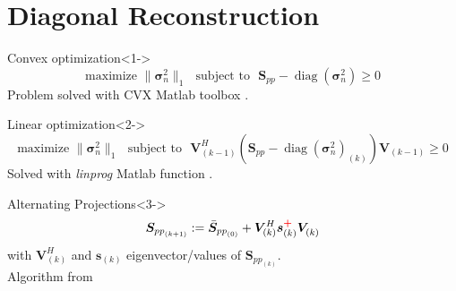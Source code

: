 \documentclass[9pt,xcolor=x11names,compress, notes=show]{beamer}%
\newcommand{\diag}[1]{\operatorname{diag}\left(#1\right)}
\begin{document}
\section{Diagonal Reconstruction}
\begin{frame}{\insertsectionhead}	
	\begin{block}{Convex optimization}<1->
		\begin{equation*}
        			\text{maximize~} \| \bm{\sigma}_{n}^2\|_1 \text{~~subject to~~} \bm{S}_{pp}- \diag{\bm{\sigma}_n^2} \geq 0
		\end{equation*}
		Problem solved with CVX Matlab toolbox \citep{Hald2017}.
	\end{block}
	\begin{block}{Linear optimization}<2->
		\begin{equation*}
			\text{maximize~} \| \bm{\sigma}_{n}^2\|_1   \text{~~subject to~~}  \bm{V}^{H}_{(k-1)} \left( \bm{S}_{pp}- \diag{\bm{\sigma}_n^2}_{(k)} \right) \bm{V}_{(k-1)} \geq 0 
		\end{equation*}
		Solved with \textit{linprog} Matlab function \citep{dougherty2016}.
	\end{block}
	\begin{block}{Alternating Projections}<3->
		\begin{equation*}
        			 \bm{S}_{{pp}_{(k+1)}} := \bar{\bm{S}}_{{pp}_{(0)}} + \bm{V}^{H}_{(k)} \bm{s}_{(k)}^{\textcolor{red}{\textbf{+}}}\bm{V}^{~}_{(k)}
		\end{equation*}
		with $\bm{V}^{H}_{(k)}$ and $\bm{s}_{(k)}$ eigenvector/values of  $\bm{S}_{{pp}_{(k)}}$.\\
		Algorithm from \cite{leclere:hal-01279944}	
	\end{block}	
\end{frame}
\end{document}
